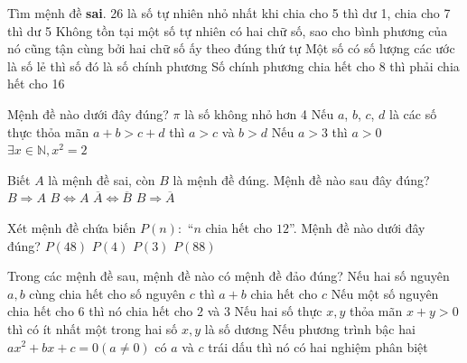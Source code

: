 \begin{ex}%
	Tìm mệnh đề  \textbf{sai}.
	 \choice
		{26 là số tự nhiên  nhỏ nhất khi chia cho 5 thì dư 1, chia cho 7 thì dư 5}
		{\True Không tồn tại một số tự nhiên có  hai chữ số, sao cho bình phương của nó cũng tận cùng bởi hai chữ số ấy theo đúng thứ tự}
		{Một số có số lượng các ước là số  lẻ thì số đó là số chính phương}
		{Số chính  phương chia hết cho 8 thì phải chia hết cho 16}
\end{ex}

\begin{ex}%
	Mệnh đề nào dưới đây  đúng?
	 \choice
		{$\pi$ là số  không nhỏ hơn 4}
		{Nếu $a$, $b$,  $c$, $d$ là các số thực thỏa mãn $a+b>c+d$ thì $a>c$ và $b>d$}
		{\True Nếu $a>3$ thì $a>0$} 
		{$\exists  x\in \mathbb{N},x^2=2$ }
\end{ex}

\begin{ex}%
	Biết $A$ là mệnh đề sai, còn $B$ là mệnh đề đúng. Mệnh đề nào sau đây đúng? 
	\choice 
		{  $B\Rightarrow A$}
		{ $B\Leftrightarrow A$ } 
		{ $\overline{A}\Leftrightarrow \overline{B}$  }
		{ \True  $B\Rightarrow \overline{A}$}
\end{ex}

\begin{ex}%
	Xét mệnh đề chứa biến $P(n):$ “$n$ chia hết cho $12$”. Mệnh đề nào dưới đây đúng? 
	\choice 
		{\True  $P(48)$}
		{ $P(4)  $}
		{  $P(3)$}
		{  $P(88)$}
\end{ex}

\begin{ex}%
	Trong các mệnh đề sau, mệnh đề  nào có mệnh đề đảo đúng?
	\choice 
		{Nếu hai số nguyên $a, b$ cùng chia hết cho số  nguyên $c$ thì $a+b$ chia hết cho $c$}
		{\True Nếu một số nguyên chia  hết cho $6$ thì nó chia hết cho $2$ và $3$}
		{Nếu hai số thực $x, y$ thỏa mãn $x+y>0$ thì có ít nhất một trong  hai số $x, y$ là số dương}
		{Nếu phương trình bậc hai $ax^2+bx+c=0 (a \ne 0)$ có $a$  và $c$ trái dấu thì nó có hai nghiệm phân biệt}
\end{ex}

